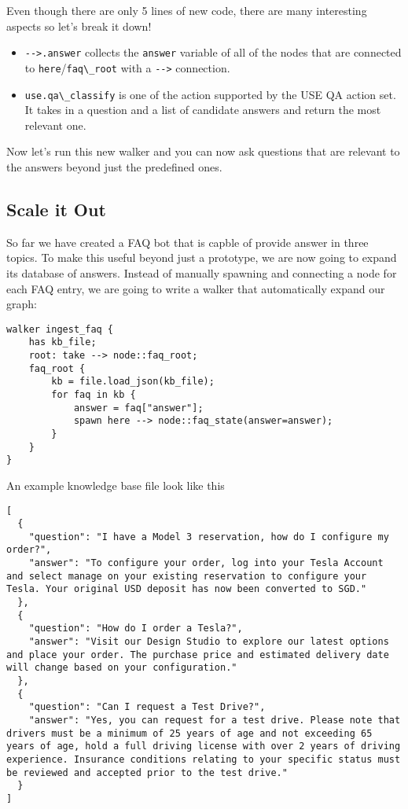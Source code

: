 Even though there are only 5 lines of new code, there are many
interesting aspects so let's break it down!

\begin{itemize}
\tightlist
\item
  \passthrough{\lstinline!-->.answer!} collects the
  \passthrough{\lstinline!answer!} variable of all of the nodes that are
  connected to
  \passthrough{\lstinline!here!}/\passthrough{\lstinline!faq\_root!}
  with a \passthrough{\lstinline!-->!} connection.
\item
  \passthrough{\lstinline!use.qa\_classify!} is one of the action
  supported by the USE QA action set. It takes in a question and a list
  of candidate answers and return the most relevant one.
\end{itemize}

Now let's run this new walker and you can now ask questions that are
relevant to the answers beyond just the predefined ones.

\hypertarget{scale-it-out}{%
\subsection{Scale it Out}\label{scale-it-out}}

So far we have created a FAQ bot that is capble of provide answer in
three topics. To make this useful beyond just a prototype, we are now
going to expand its database of answers. Instead of manually spawning
and connecting a node for each FAQ entry, we are going to write a walker
that automatically expand our graph:

\begin{lstlisting}
walker ingest_faq {
    has kb_file;
    root: take --> node::faq_root;
    faq_root {
        kb = file.load_json(kb_file);
        for faq in kb {
            answer = faq["answer"];
            spawn here --> node::faq_state(answer=answer);
        }
    }
}
\end{lstlisting}

An example knowledge base file look like this

\begin{lstlisting}
[
  {
    "question": "I have a Model 3 reservation, how do I configure my order?",
    "answer": "To configure your order, log into your Tesla Account and select manage on your existing reservation to configure your Tesla. Your original USD deposit has now been converted to SGD."
  },
  {
    "question": "How do I order a Tesla?",
    "answer": "Visit our Design Studio to explore our latest options and place your order. The purchase price and estimated delivery date will change based on your configuration."
  },
  {
    "question": "Can I request a Test Drive?",
    "answer": "Yes, you can request for a test drive. Please note that drivers must be a minimum of 25 years of age and not exceeding 65 years of age, hold a full driving license with over 2 years of driving experience. Insurance conditions relating to your specific status must be reviewed and accepted prior to the test drive."
  }
]
\end{lstlisting}

